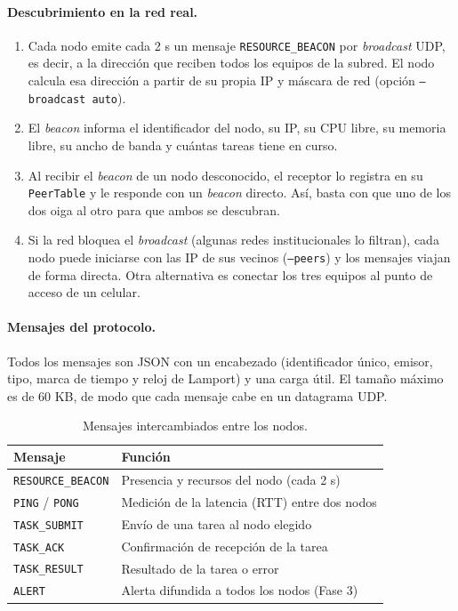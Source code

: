 \paragraph{Descubrimiento en la red real.}
\begin{enumerate}
\item Cada nodo emite cada 2 s un mensaje \texttt{RESOURCE\_BEACON} por \emph{broadcast} UDP, es decir,
a la dirección que reciben todos los equipos de la subred. El nodo calcula esa dirección a partir de
su propia IP y máscara de red (opción \texttt{--broadcast auto}).
\item El \emph{beacon} informa el identificador del nodo, su IP, su CPU libre, su memoria libre, su ancho
de banda y cuántas tareas tiene en curso.
\item Al recibir el \emph{beacon} de un nodo desconocido, el receptor lo registra en su \texttt{PeerTable}
y le responde con un \emph{beacon} directo. Así, basta con que uno de los dos oiga al otro para que
ambos se descubran.
\item Si la red bloquea el \emph{broadcast} (algunas redes institucionales lo filtran), cada nodo puede
iniciarse con las IP de sus vecinos (\texttt{--peers}) y los mensajes viajan de forma directa. Otra
alternativa es conectar los tres equipos al punto de acceso de un celular.
\end{enumerate}

\paragraph{Mensajes del protocolo.}
Todos los mensajes son JSON con un encabezado (identificador único, emisor, tipo, marca de tiempo y
reloj de Lamport) y una carga útil. El tamaño máximo es de 60 KB, de modo que cada mensaje cabe en un
datagrama UDP.

\begin{table}[htbp]
\centering
\small
\begin{tabular}{|l|p{}|}
\hline
\textbf{Mensaje} & \textbf{Función} \\ \hline
\texttt{RESOURCE\_BEACON} & Presencia y recursos del nodo (cada 2 s) \\ \hline
\texttt{PING} / \texttt{PONG} & Medición de la latencia (RTT) entre dos nodos \\ \hline
\texttt{TASK\_SUBMIT} & Envío de una tarea al nodo elegido \\ \hline
\texttt{TASK\_ACK} & Confirmación de recepción de la tarea \\ \hline
\texttt{TASK\_RESULT} & Resultado de la tarea o error \\ \hline
\texttt{ALERT} & Alerta difundida a todos los nodos (Fase 3) \\ \hline
\end{tabular}
\caption{Mensajes intercambiados entre los nodos.}
\label{tab:mensajes}
\end{table}


